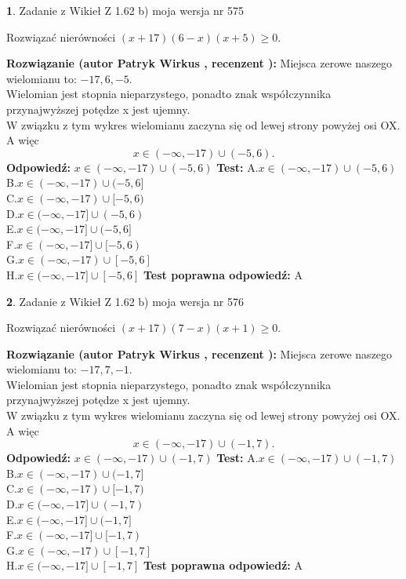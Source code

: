 \documentclass[12pt, a4paper]{article}
\theoremstyle{definition} %
\newtheorem{zad}{}
\newcommand{\zadStart}[1]{\begin{zad}#1\newline}
\newcommand{\zadStop}{\end{zad}}
\newcommand{\rozwStart}[2]{\noindent \textbf{Rozwiązanie (autor #1 , recenzent #2): }\newline}
\newcommand{\rozwStop}{\newline}
\newcommand{\odpStart}{\noindent \textbf{Odpowiedź:}\newline}
\newcommand{\odpStop}{\newline}
\newcommand{\testStart}{\noindent \textbf{Test:}\newline}
\newcommand{\testStop}{\newline}
\newcommand{\kluczStart}{\noindent \textbf{Test poprawna odpowiedź:}\newline}
\newcommand{\kluczStop}{\newline}
\begin{document}
\zadStart{Zadanie z Wikieł Z 1.62 b) moja wersja nr 575}

Rozwiązać nierówności $(x+17)(6-x)(x+5)\ge0$.
\zadStop
\rozwStart{Patryk Wirkus}{}
Miejsca zerowe naszego wielomianu to: $-17, 6, -5$.\\
Wielomian jest stopnia nieparzystego, ponadto znak współczynnika przy\linebreak najwyższej potędze x jest ujemny.\\ W związku z tym wykres wielomianu zaczyna się od lewej strony powyżej osi OX. A więc $$x \in (-\infty,-17) \cup (-5,6).$$
\rozwStop
\odpStart
$x \in (-\infty,-17) \cup (-5,6)$
\odpStop
\testStart
A.$x \in (-\infty,-17) \cup (-5,6)$\\
B.$x \in (-\infty,-17) \cup (-5,6]$\\
C.$x \in (-\infty,-17) \cup [-5,6)$\\
D.$x \in (-\infty,-17] \cup (-5,6)$\\
E.$x \in (-\infty,-17] \cup (-5,6]$\\
F.$x \in (-\infty,-17] \cup [-5,6)$\\
G.$x \in (-\infty,-17) \cup [-5,6]$\\
H.$x \in (-\infty,-17] \cup [-5,6]$
\testStop
\kluczStart
A
\kluczStop



\zadStart{Zadanie z Wikieł Z 1.62 b) moja wersja nr 576}

Rozwiązać nierówności $(x+17)(7-x)(x+1)\ge0$.
\zadStop
\rozwStart{Patryk Wirkus}{}
Miejsca zerowe naszego wielomianu to: $-17, 7, -1$.\\
Wielomian jest stopnia nieparzystego, ponadto znak współczynnika przy\linebreak najwyższej potędze x jest ujemny.\\ W związku z tym wykres wielomianu zaczyna się od lewej strony powyżej osi OX. A więc $$x \in (-\infty,-17) \cup (-1,7).$$
\rozwStop
\odpStart
$x \in (-\infty,-17) \cup (-1,7)$
\odpStop
\testStart
A.$x \in (-\infty,-17) \cup (-1,7)$\\
B.$x \in (-\infty,-17) \cup (-1,7]$\\
C.$x \in (-\infty,-17) \cup [-1,7)$\\
D.$x \in (-\infty,-17] \cup (-1,7)$\\
E.$x \in (-\infty,-17] \cup (-1,7]$\\
F.$x \in (-\infty,-17] \cup [-1,7)$\\
G.$x \in (-\infty,-17) \cup [-1,7]$\\
H.$x \in (-\infty,-17] \cup [-1,7]$
\testStop
\kluczStart
A
\kluczStop
\end{document}

